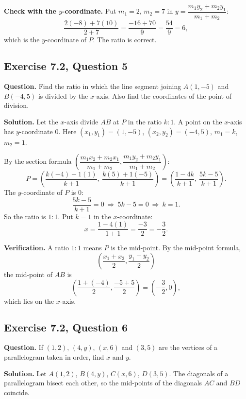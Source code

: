 \textbf{Check with the $y$-coordinate.} Put $m_1=2$, $m_2=7$ in $y=\dfrac{m_1y_2+m_2y_1}{m_1+m_2}$:
\[\frac{2(-8)+7(10)}{2+7}=\frac{-16+70}{9}=\frac{54}{9}=6,\]
which is the $y$-coordinate of $P$. The ratio is correct.


\subsection*{Exercise 7.2, Question 5}
\textbf{Question.} Find the ratio in which the line segment joining $A(1,-5)$ and $B(-4,5)$ is divided by the $x$-axis. Also find the coordinates of the point of division.

\textbf{Solution.} Let the $x$-axis divide $AB$ at $P$ in the ratio $k:1$. A point on the $x$-axis has $y$-coordinate $0$. Here $(x_1,y_1)=(1,-5)$, $(x_2,y_2)=(-4,5)$, $m_1=k$, $m_2=1$.

By the section formula $\left(\dfrac{m_1x_2+m_2x_1}{m_1+m_2},\dfrac{m_1y_2+m_2y_1}{m_1+m_2}\right)$:
\[
P=\left(\frac{k(-4)+1(1)}{k+1},\ \frac{k(5)+1(-5)}{k+1}\right)=\left(\frac{1-4k}{k+1},\ \frac{5k-5}{k+1}\right).
\]
The $y$-coordinate of $P$ is $0$:
\[\frac{5k-5}{k+1}=0\ \Rightarrow\ 5k-5=0\ \Rightarrow\ k=1 .\]
So the ratio is $1:1$. Put $k=1$ in the $x$-coordinate:
\[x=\frac{1-4(1)}{1+1}=\frac{-3}{2}=-\frac32 .\]

\textbf{Verification.} A ratio $1:1$ means $P$ is the mid-point. By the mid-point formula,
\[
\left(\dfrac{x_1+x_2}{2},\dfrac{y_1+y_2}{2}\right)
\]
the mid-point of $AB$ is
\[
\left(\dfrac{1+(-4)}{2},\dfrac{-5+5}{2}\right)=\left(-\dfrac32,0\right),
\]
which lies on the $x$-axis.


\subsection*{Exercise 7.2, Question 6}
\textbf{Question.} If $(1,2)$, $(4,y)$, $(x,6)$ and $(3,5)$ are the vertices of a parallelogram taken in order, find $x$ and $y$.

\textbf{Solution.} Let $A(1,2)$, $B(4,y)$, $C(x,6)$, $D(3,5)$. The diagonals of a parallelogram bisect each other, so the mid-points of the diagonals $AC$ and $BD$ coincide.

